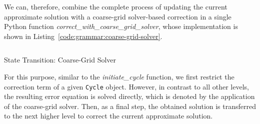 We can, therefore, combine the complete process of updating the current approximate solution with a coarse-grid solver-based correction in a single Python function \emph{correct\_with\_coarse\_grid\_solver}, whose implementation is shown in Listing~\ref{code:grammar:coarse-grid-solver}.
\begin{listing}
	\inputminted{python}{evostencils/grammar/coarse_grid_solver.py}
	\caption{State Transition: Coarse-Grid Solver}
	\label{code:grammar:coarse-grid-solver}
\end{listing}
For this purpose, similar to the \emph{initiate\_cycle} function, we first restrict the correction term of a given \texttt{Cycle} object.
However, in contrast to all other levels, the resulting error equation is solved directly, which is denoted by the application of the coarse-grid solver.
Then, as a final step, the obtained solution is transferred to the next higher level to correct the current approximate solution.
